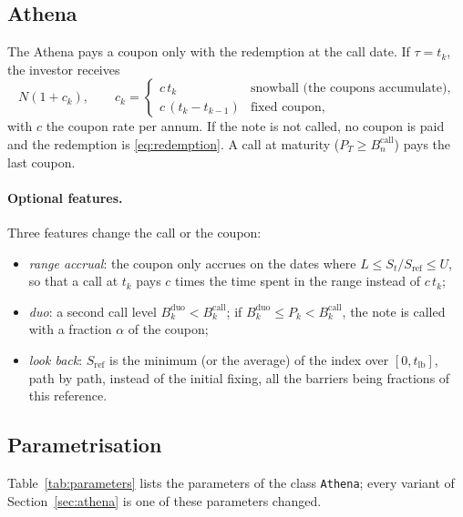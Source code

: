 \documentclass[11pt,a4paper]{article}
\newcommand{\code}[1]{\texttt{#1}}
\newcommand{\Sref}{S_{\mathrm{ref}}}
\begin{document}
\subsection{Athena}
The Athena pays a coupon only with the redemption at the call date. If $\tau = t_k$, the investor receives
\begin{equation}
N(1 + c_k), \qquad c_k = \begin{cases} c\, t_k & \text{snowball (the coupons accumulate)}, \\ c\,(t_k - t_{k-1}) & \text{fixed coupon}, \end{cases}
\end{equation}
with $c$ the coupon rate per annum. If the note is not called, no coupon is paid and the redemption is
\eqref{eq:redemption}. A call at maturity ($P_T \ge B^{\mathrm{call}}_n$) pays the last coupon.

\paragraph{Optional features.} Three features change the call or the coupon:
\begin{itemize}
\item \emph{range accrual}: the coupon only accrues on the dates where $L \le S_t/\Sref \le U$, so that a call at
$t_k$ pays $c$ times the time spent in the range instead of $c\,t_k$;
\item \emph{duo}: a second call level $B^{\mathrm{duo}}_k < B^{\mathrm{call}}_k$; if
$B^{\mathrm{duo}}_k \le P_k < B^{\mathrm{call}}_k$, the note is called with a fraction $\alpha$ of the coupon;
\item \emph{look back}: $\Sref$ is the minimum (or the average) of the index over $[0, t_{\mathrm{lb}}]$, path by path,
instead of the initial fixing, all the barriers being fractions of this reference.
\end{itemize}

\subsection{Parametrisation}
Table~\ref{tab:parameters} lists the parameters of the class \code{Athena}; every variant of
Section~\ref{sec:athena} is one of these parameters changed.
\end{document}
